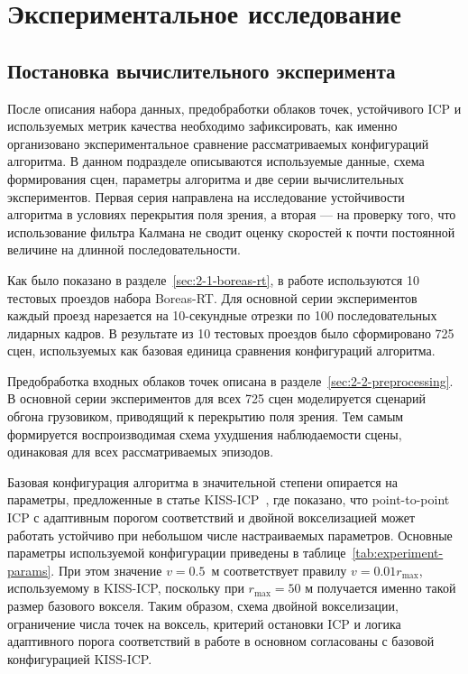 \section{Экспериментальное исследование}
\subsection{Постановка вычислительного эксперимента}
\label{sec:3-1-experimental-setup}

После описания набора данных, предобработки облаков точек, устойчивого ICP и используемых метрик качества необходимо зафиксировать, как именно организовано экспериментальное сравнение рассматриваемых конфигураций алгоритма. В данном подразделе описываются используемые данные, схема формирования сцен, параметры алгоритма и две серии вычислительных экспериментов. Первая серия направлена на исследование устойчивости алгоритма в условиях перекрытия поля зрения, а вторая --- на проверку того, что использование фильтра Калмана не сводит оценку скоростей к почти постоянной величине на длинной последовательности.

Как было показано в разделе~\ref{sec:2-1-boreas-rt}, в работе используются 10 тестовых проездов набора Boreas-RT. Для основной серии экспериментов каждый проезд нарезается на 10-секундные отрезки по 100 последовательных лидарных кадров. В результате из 10 тестовых проездов было сформировано 725 сцен, используемых как базовая единица сравнения конфигураций алгоритма.

Предобработка входных облаков точек описана в разделе~\ref{sec:2-2-preprocessing}. В основной серии экспериментов для всех 725 сцен моделируется сценарий обгона грузовиком, приводящий к перекрытию поля зрения. Тем самым формируется воспроизводимая схема ухудшения наблюдаемости сцены, одинаковая для всех рассматриваемых эпизодов.

Базовая конфигурация алгоритма в значительной степени опирается на параметры, предложенные в статье KISS-ICP~\cite{kiss-icp}, где показано, что point-to-point ICP с адаптивным порогом соответствий и двойной вокселизацией может работать устойчиво при небольшом числе настраиваемых параметров. Основные параметры используемой конфигурации приведены в таблице~\ref{tab:experiment-params}. При этом значение \(v=0.5\)~м соответствует правилу \(v = 0.01 r_{\max}\), используемому в KISS-ICP, поскольку при \(r_{\max}=50\) м получается именно такой размер базового вокселя. Таким образом, схема двойной вокселизации, ограничение числа точек на воксель, критерий остановки ICP и логика адаптивного порога соответствий в работе в основном согласованы с базовой конфигурацией KISS-ICP.

